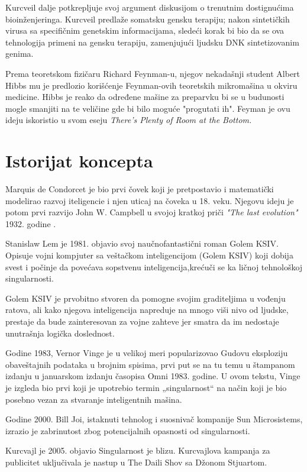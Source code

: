 \documentclass[a4paper]{article}
\begin{document}
  Kurcveil dalje potkrepljuje svoj argument diskusijom o trenutnim dostignućima bioinženjeringa. Kurcveil predlaže somatsku gensku terapiju; nakon sintetičkih virusa sa specifičnim genetskim informacijama, sledeći korak bi bio da se ova tehnologija primeni na gensku terapiju, zamenjujući ljudsku DNK sintetizovanim genima.\cite{refe5}

  Prema teoretskom fizičaru  Richard Feynman-u, njegov nekadašnji student Albert Hibbs mu je predlozio korišćenje Feynman-ovih teoretskih mikromašina u okviru medicine. Hibbs je reako da određene mašine za preparvku bi se u budunosti mogle smanjiti na te veličine gde bi bilo moguće "progutati ih". Feyman je ovu ideju iskoristio u svom eseju \textit{ There's Plenty of Room at the Bottom.}\cite{refe6}
\section{Istorijat koncepta}
\label{sec:istorijat}

Marquis de Condorcet je bio prvi čovek koji je pretpostavio i matematički modelirao razvoj iteligencie i njen uticaj na čoveka u 18. veku. Njegovu ideju je potom prvi razvijo John W. Campbell u svojoj kratkoj priči\textit{ "The last evolution"} 1932. godine .\cite{refe7}

Stanislaw Lem je 1981. objavio svoj naučnofantastični roman Golem KSIV. Opisuje vojni kompjuter sa veštačkom inteligencijom (Golem KSIV) koji dobija svest i počinje da povećava sopstvenu inteligencija,krećuči se ka ličnoj tehnološkoj singularnosti.\cite{refe8}


Golem KSIV je prvobitno stvoren da pomogne svojim graditeljima u vođenju ratova, ali kako njegova inteligencija napreduje na mnogo viši nivo od ljudske, prestaje da bude zainteresovan za vojne zahteve jer smatra da im nedostaje unutrašnja logička doslednost.

Godine 1983, Vernor Vinge je u velikoj meri popularizovao Gudovu eksploziju obaveštajnih podataka u brojnim spisima, prvi put se na tu temu u štampanom izdanju u januarskom izdanju časopisa Omni 1983. godine. U ovom tekstu, Vinge je izgleda bio prvi koji je upotrebio termin „singularnost“ na način koji je bio posebno vezan za stvaranje inteligentnih mašina.\cite{refe9}

Godine 2000. Bill Joi, istaknuti tehnolog i suosnivač kompanije Sun Microsistems, izrazio je zabrinutost zbog potencijalnih opasnosti od singularnosti.\cite{refe10}

Kurcvajl je 2005. objavio Singularnost je blizu. Kurcvajlova kampanja za publicitet uključivala je nastup u The Daili Shov sa Džonom Stjuartom.\cite{refe11}
\end{document}

